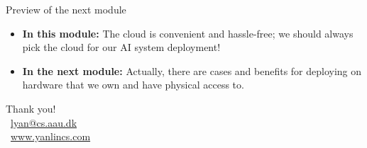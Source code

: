 \documentclass[aspectratio=169]{beamer}
\begin{document}
\begin{frame}{Preview of the next module}
  \begin{itemize}
    \item \textbf{In this module:} The cloud is convenient and hassle-free; we should always pick the cloud for our AI system deployment!
    \item \textbf{In the next module:} Actually, there are cases and benefits for deploying on hardware that we own and have physical access to.
  \end{itemize}
\note{
}
\end{frame}



\appendix

\begin{frame}
\begin{center}
{\large Thank you!}
\vspace{1cm}
\\[0.5em]
{\small \faEnvelope\ \href{mailto:lyan@cs.aau.dk}{lyan@cs.aau.dk} \\
\faGlobe\ \href{https://www.yanlincs.com}{www.yanlincs.com}}
\end{center}
\note{
}
\end{frame}
\end{document}
